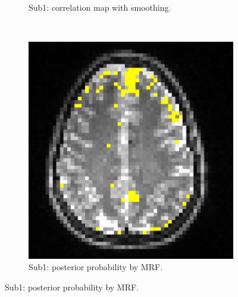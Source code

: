 \begin{figure}[p]
\begin{subfigure}[t]{0.3\textwidth}
    \caption{Sub1: correlation map with smoothing.}
    \label{fig:invivo12}
    \end{subfigure}
~
  \begin{subfigure}[t]{0.3\textwidth}
    \centering
    \includegraphics[width=\textwidth]{figures/method1/invivo1/r1_mrf}
    \caption{Sub1: posterior probability by MRF.}
    \label{fig:invivo13}
    \end{subfigure}


\end{figure}
